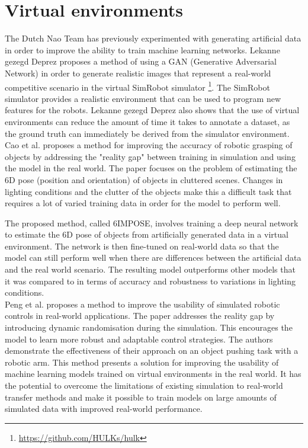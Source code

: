 \documentclass{uva-inf-bachelor-thesis}
\begin{document}
    \section{Virtual environments}
        The Dutch Nao Team has previously experimented with generating artificial data in order to improve the ability to train machine learning networks. Lekanne gezegd Deprez \cite{hidde} proposes a method of using a GAN (Generative Adversarial Network) in order to generate realistic images that represent a real-world competitive scenario in the virtual SimRobot simulator \footnote{\url{https://github.com/HULKs/hulk}}. The SimRobot simulator provides a realistic environment that can be used to program new features for the robots. Lekanne gezegd Deprez \cite{hidde} also shows that the use of virtual environments can reduce the amount of time it takes to annotate a dataset, as the ground truth can immediately be derived from the simulator environment. 
        \hfill \break \\
        Cao et al.\cite{6impose} proposes a method for improving the accuracy of robotic grasping of objects by addressing the "reality gap" between training in simulation and using the model in the real world. The paper focuses on the problem of estimating the 6D pose (position and orientation) of objects in cluttered scenes. Changes in lighting conditions and the clutter of the objects make this a difficult task that requires a lot of varied training data in order for the model to perform well.

        The proposed method, called 6IMPOSE, involves training a deep neural network to estimate the 6D pose of objects from artificially generated data in a virtual environment. The network is then fine-tuned on real-world data so that the model can still perform well when there are differences between the artificial data and the real world scenario. The resulting model outperforms other models that it was compared to in terms of accuracy and robustness to variations in lighting conditions.
        \hfill \break \\
        Peng et al.\cite{sim2real} proposes a method to improve the usability of simulated robotic controls in real-world applications. The paper addresses the reality gap by introducing dynamic randomisation during the simulation. This encourages the model to learn more robust and adaptable control strategies. The authors demonstrate the effectiveness of their approach on an object pushing task with a robotic arm. 
        This method presents a solution for improving the usability of machine learning models trained on virtual environments in the real world. It has the potential to overcome the limitations of existing simulation to real-world transfer methods and make it possible to train models on large amounts of simulated data with improved real-world performance.
\end{document}
